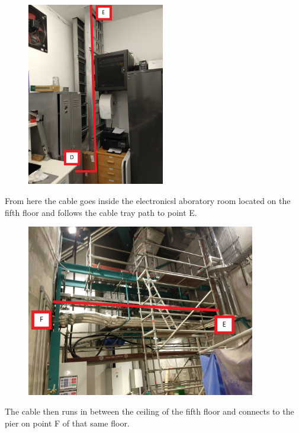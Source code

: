   
\newpage

  \begin{figure}
    \centering
    \includegraphics[width=6cm]{images/17.jpg}
  \end{figure}

From here the cable goes inside the electronicsl aboratory room located on the fifth floor and follows the cable tray path to point E.

  \begin{figure}
    \centering
    \includegraphics[width=10cm]{images/18.jpg}
  \end{figure}

The cable then runs in between the ceiling of the fifth floor and connects to the pier on point F of that same floor.

